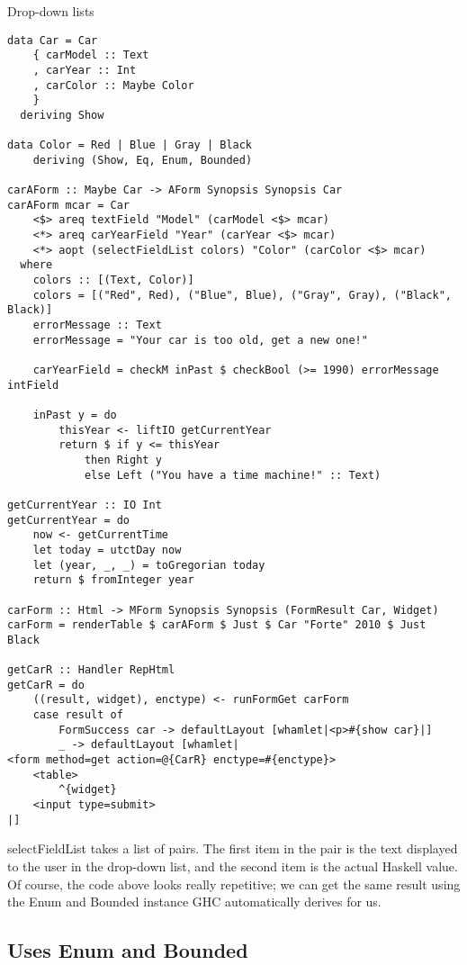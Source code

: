 Drop-down lists

\begin{lstlisting}
data Car = Car
    { carModel :: Text
    , carYear :: Int
    , carColor :: Maybe Color
    }
  deriving Show

data Color = Red | Blue | Gray | Black
    deriving (Show, Eq, Enum, Bounded)

carAForm :: Maybe Car -> AForm Synopsis Synopsis Car
carAForm mcar = Car
    <$> areq textField "Model" (carModel <$> mcar)
    <*> areq carYearField "Year" (carYear <$> mcar)
    <*> aopt (selectFieldList colors) "Color" (carColor <$> mcar)
  where
    colors :: [(Text, Color)]
    colors = [("Red", Red), ("Blue", Blue), ("Gray", Gray), ("Black", Black)]
    errorMessage :: Text
    errorMessage = "Your car is too old, get a new one!"

    carYearField = checkM inPast $ checkBool (>= 1990) errorMessage intField

    inPast y = do
        thisYear <- liftIO getCurrentYear
        return $ if y <= thisYear
            then Right y
            else Left ("You have a time machine!" :: Text)

getCurrentYear :: IO Int
getCurrentYear = do
    now <- getCurrentTime
    let today = utctDay now
    let (year, _, _) = toGregorian today
    return $ fromInteger year

carForm :: Html -> MForm Synopsis Synopsis (FormResult Car, Widget)
carForm = renderTable $ carAForm $ Just $ Car "Forte" 2010 $ Just Black

getCarR :: Handler RepHtml
getCarR = do
    ((result, widget), enctype) <- runFormGet carForm
    case result of
        FormSuccess car -> defaultLayout [whamlet|<p>#{show car}|]
        _ -> defaultLayout [whamlet|
<form method=get action=@{CarR} enctype=#{enctype}>
    <table>
        ^{widget}
    <input type=submit>
|]
\end{lstlisting}

selectFieldList takes a list of pairs. The first item in the pair is the text displayed to
the user in the drop-down list, and the second item is the actual Haskell value. Of
course, the code above looks really repetitive; we can get the same result using the Enum
and Bounded instance GHC automatically derives for us.

\subsection{Uses Enum and Bounded}

